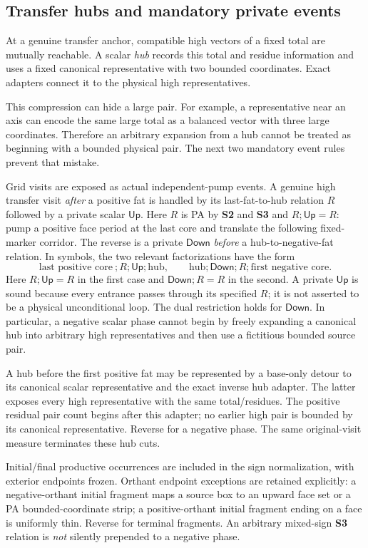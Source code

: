 \documentclass[11pt,a4paper]{article}
\theoremstyle{remark}
\newcommand{\Up}{\mathsf{Up}}
\newcommand{\Down}{\mathsf{Down}}
\begin{document}
\subsection{Transfer hubs and mandatory private events}\label{sec:hubs}

At a genuine transfer anchor, compatible high vectors of a fixed total
are mutually reachable. A scalar \emph{hub} records this total and
residue information and uses a fixed canonical representative with two
bounded coordinates. Exact adapters connect it to the physical high
representatives.

This compression can hide a large pair. For example, a representative
near an axis can encode the same large total as a balanced vector with
three large coordinates. Therefore an arbitrary expansion from a hub
cannot be treated as beginning with a bounded physical pair.
The next two mandatory event rules prevent that mistake.

Grid visits are exposed as actual independent-pump events. A genuine high transfer visit \emph{after} a positive fat is handled by its last-fat-to-hub relation \(R\) followed by a private scalar \(\Up\). Here \(R\) is PA by \textbf{S2} and \textbf{S3} and \(R;\Up=R\): pump a positive face period at the last core and translate the following fixed-marker corridor. The reverse is a private \(\Down\) \emph{before} a hub-to-negative-fat relation. In symbols, the two relevant factorizations have the form
\[
 \text{last positive core}\ ;R;\Up;\text{hub},
 \qquad
 \text{hub};\Down;R;\text{first negative core}.
\]
Here \(R;\Up=R\) in the first case and \(\Down;R=R\) in the
second. A private \(\Up\) is sound because every entrance passes
through its specified \(R\); it is not asserted to be a physical
unconditional loop. The dual restriction holds for \(\Down\).
In particular, a negative scalar phase cannot begin by freely expanding
a canonical hub into arbitrary high representatives and then use a
fictitious bounded source pair.

A hub before the first positive fat may be represented by a base-only detour to its canonical scalar representative and the exact inverse hub adapter. The latter exposes every high representative with the same total/residues. The positive residual pair count begins after this adapter; no earlier high pair is bounded by its canonical representative. Reverse for a negative phase. The same original-visit measure terminates these hub cuts.

Initial/final productive occurrences are included in the sign normalization, with exterior endpoints frozen. Orthant endpoint exceptions are retained explicitly: a negative-orthant initial fragment maps a source box to an upward face set or a PA bounded-coordinate strip; a positive-orthant initial fragment ending on a face is uniformly thin. Reverse for terminal fragments. An arbitrary mixed-sign \textbf{S3} relation is \emph{not} silently prepended to a negative phase.
\end{document}
